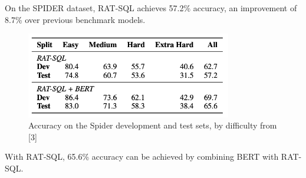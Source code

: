 On the SPIDER dataset, RAT-SQL achieves 57.2\% accuracy, an improvement of 8.7\% over previous benchmark models.

\begin{figure}[htb]
    \centering
    \includegraphics[width=0.8\textwidth]{pics/RAT-SQL/Accuracy2.png}
    \caption{Accuracy on the Spider development and test sets, by difficulty from [3]}
    \label{fig:RAT-SQL-Accuracy2}
\end{figure}

With RAT-SQL, 65.6\% accuracy can be achieved by combining BERT with RAT-SQL.
